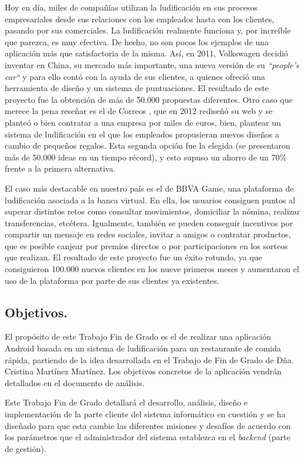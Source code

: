 \documentclass[twoside]{report}
\begin{document}
Hoy en día, miles de compañías utilizan la ludificación en sus procesos empresariales desde sus relaciones con los empleados hasta con los clientes, pasando por sus comerciales. La ludificación realmente funciona y, por increíble que parezca, es muy efectiva. De hecho, no son pocos los ejemplos de una aplicación más que satisfactoria de la misma. Así, en 2011, \cite{accentureGami} Volkswagen decidió inventar en China, su mercado más importante, una nueva versión de su \textit{“people’s car“} y para ello contó con la ayuda de sus clientes, a quienes ofreció una herramienta de diseño y un sistema de puntuaciones. El resultado de este proyecto fue la obtención de más de 50.000 propuestas diferentes. Otro caso que merece la pena reseñar es el de Correos \cite{confidencialcorreosgami}, que en 2012 rediseñó su web y se planteó o bien contratar a una empresa por miles de euros, bien, plantear un sistema de ludificación en el que los empleados propusieran nuevos diseños a cambio de pequeños regalos. Esta segunda opción fue la elegida (se presentaron más de 50.000 ideas en un tiempo récord), y esto supuso un ahorro de un 70\% frente a la primera alternativa. 

El caso más destacable en nuestro país es el de \cite{bbvag} BBVA Game, una plataforma de ludificación asociada a la banca virtual. En ella, los usuarios consiguen puntos al superar distintos retos como consultar movimientos, domiciliar la nómina, realizar transferencias, etcétera. Igualmente, también se pueden conseguir incentivos por compartir un mensaje en redes sociales,  invitar a amigos o contratar productos, que es posible canjear por premios directos o por participaciones en los sorteos que realizan. El resultado de este proyecto fue un éxito rotundo, ya que consiguieron 100.000 nuevos clientes en los nueve primeros meses y aumentaron el uso de la plataforma por parte de sus clientes ya existentes.

\subsection{Objetivos.}

El propósito de este Trabajo Fin de Grado es el de realizar una aplicación Android basada en un sistema de ludificación para un restaurante de comida rápida, partiendo de la idea desarrollada en el \cite{cristinatfg} Trabajo de Fin de Grado de Dña. Cristina Martínez Martínez. Los objetivos concretos de la aplicación vendrán detallados en el documento de análisis.

Este Trabajo Fin de Grado detallará el desarrollo, análisis, diseño e implementación de la parte cliente del sistema informático en cuestión y se ha diseñado para que esta cambie las diferentes misiones y desafíos de acuerdo con los parámetros que el administrador del sistema establezca en el \textit{backend} (parte de gestión).
\end{document}
